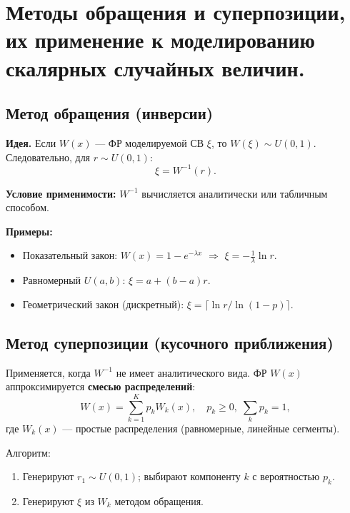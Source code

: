 \section{Методы обращения и суперпозиции, их применение к моделированию скалярных случайных величин.}

\subsection*{Метод обращения (инверсии)}

\textbf{Идея.} Если $W(x)$ — ФР моделируемой СВ $\xi$, то $W(\xi) \sim U(0,1)$. Следовательно, для $r \sim U(0,1)$:
\[
  \xi = W^{-1}(r).
\]

\textbf{Условие применимости:} $W^{-1}$ вычисляется аналитически или табличным способом.

\textbf{Примеры:}
\begin{itemize}
  \item Показательный закон: $W(x)=1-e^{-\lambda x}$ $\Rightarrow$ $\xi = -\frac{1}{\lambda}\ln r$.
  \item Равномерный $U(a,b)$: $\xi = a + (b-a)r$.
  \item Геометрический закон (дискретный): $\xi = \lceil \ln r / \ln(1-p) \rceil$.
\end{itemize}

\subsection*{Метод суперпозиции (кусочного приближения)}

Применяется, когда $W^{-1}$ не имеет аналитического вида. ФР $W(x)$ аппроксимируется \textbf{смесью распределений}:
\[
  W(x) = \sum_{k=1}^K p_k W_k(x), \quad p_k \geqslant 0,\; \sum_k p_k = 1,
\]
где $W_k(x)$ — простые распределения (равномерные, линейные сегменты).

Алгоритм:
\begin{enumerate}
  \item Генерируют $r_1 \sim U(0,1)$; выбирают компоненту $k$ с вероятностью $p_k$.
  \item Генерируют $\xi$ из $W_k$ методом обращения.
\end{enumerate}

\clearpage
